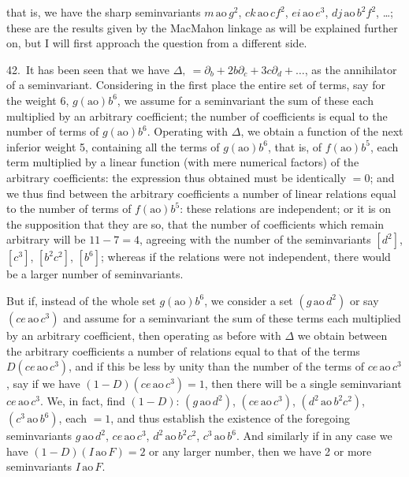 \documentclass[11pt]{article}
\begin{document}
that is, we have the sharp seminvariants $m\,\mathrm{ao}\,g^2$, $ck\,\mathrm{ao}\,cf^2$, $ei\,\mathrm{ao}\,e^3$, $dj\,\mathrm{ao}\,b^2 f^2$, \ldots; these are the results given by the MacMahon linkage as will be explained further on, but I will first approach the question from a different side.

42.\ It has been seen that we have $\Delta,\ = \partial_b + 2b\partial_c + 3c\partial_d + \ldots$, as the annihilator of a seminvariant. Considering in the first place the entire set of terms, say for the weight 6, $g(\text{ao}) b^6$, we assume for a seminvariant the sum of these each multiplied by an arbitrary coefficient; the number of coefficients is equal to the number of terms of $g(\text{ao}) b^6$. Operating with $\Delta$, we obtain a function of the next inferior weight 5, containing all the terms of $g(\text{ao}) b^6$, that is, of $f(\text{ao}) b^5$, each
term multiplied by a linear function (with mere numerical factors) of the arbitrary coefficients: the expression thus obtained must be identically $= 0$; and we thus find between the arbitrary coefficients a number of linear relations equal to the number of terms of $f(\text{ao}) b^5$: these relations are independent; or it is on the supposition that they are so, that the number of coefficients which remain arbitrary will be $11 - 7 = 4$, agreeing with the number of the seminvariants $[d^2]$, $[c^3]$, $[b^2 c^2]$, $[b^6]$; whereas if the relations were not independent, there would be a larger number of seminvariants.

But if, instead of the whole set $g(\text{ao}) b^6$, we consider a set $(g\,\mathrm{ao}\,d^2)$ or say $(ce\,\mathrm{ao}\,c^3)$ and assume for a seminvariant the sum of these terms each multiplied by an arbitrary coefficient, then operating as before with $\Delta$ we obtain between the arbitrary coefficients a number of relations equal to that of the terms $D(ce\,\mathrm{ao}\,c^3)$, and if this be less by unity than the number of the terms of $ce\,\mathrm{ao}\,c^3$, say if we have $(1 - D)(ce\,\mathrm{ao}\,c^3) = 1$, then there will be a single seminvariant $ce\,\mathrm{ao}\,c^3$. We, in fact, find $(1-D)$: $(g\,\mathrm{ao}\,d^2)$, $(ce\,\mathrm{ao}\,c^3)$, $(d^2\,\mathrm{ao}\,b^2 c^2)$, $(c^3\,\mathrm{ao}\,b^6)$, each $= 1$, and thus establish the existence of the foregoing seminvariants $g\,\mathrm{ao}\,d^2$, $ce\,\mathrm{ao}\,c^3$, $d^2\,\mathrm{ao}\,b^2 c^2$, $c^3\,\mathrm{ao}\,b^6$. And similarly if in any case we have $(1 - D)(I\,\mathrm{ao}\,F) = 2$ or any larger number, then we have 2 or more seminvariants $I\,\mathrm{ao}\,F$.
\end{document}
